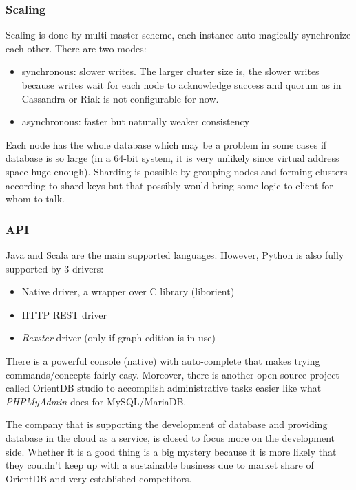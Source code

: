 \subsubsection*{Scaling}

Scaling is done by multi-master scheme, each instance auto-magically synchronize each other. There are two modes:
\begin{itemize}
  \item synchronous: slower writes. The larger cluster size is, the slower writes because writes wait for each node to acknowledge success and quorum as in Cassandra or Riak is not configurable for now.
  \item asynchronous: faster but naturally weaker consistency
\end{itemize}

Each node has the whole database which may be a problem in some cases if database is so large (in a 64-bit system, it is very unlikely since virtual address space huge enough). Sharding is possible by grouping nodes and forming clusters according to shard keys but that possibly would bring some logic to client for whom to talk.

\subsubsection*{API}

Java and Scala are the main supported languages. However, Python is also fully supported by 3 drivers:

\begin{itemize}
  \item Native driver, a wrapper over C library (liborient)
  \item HTTP REST driver
  \item \textit{Rexster} driver (only if graph edition is in use)
\end{itemize}

There is a powerful console (native) with auto-complete that makes trying commands/concepts fairly easy. Moreover, there is another open-source project called OrientDB studio to accomplish administrative tasks easier like what \textit{PHPMyAdmin} does for MySQL/MariaDB.

The company that is supporting the development of database and providing database in the cloud as a service, is closed to focus more on the development side. Whether it is a good thing is a big mystery because it is more likely that they couldn't keep up with a sustainable business due to market share of OrientDB and very established competitors.

